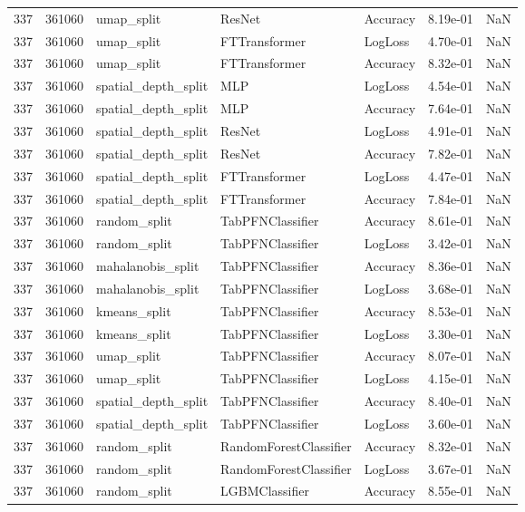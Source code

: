\begin{tabular}{rrlllrr}
337 & 361060 & umap\_split & ResNet & Accuracy & 8.19e-01 & NaN \\
337 & 361060 & umap\_split & FTTransformer & LogLoss & 4.70e-01 & NaN \\
337 & 361060 & umap\_split & FTTransformer & Accuracy & 8.32e-01 & NaN \\
337 & 361060 & spatial\_depth\_split & MLP & LogLoss & 4.54e-01 & NaN \\
337 & 361060 & spatial\_depth\_split & MLP & Accuracy & 7.64e-01 & NaN \\
337 & 361060 & spatial\_depth\_split & ResNet & LogLoss & 4.91e-01 & NaN \\
337 & 361060 & spatial\_depth\_split & ResNet & Accuracy & 7.82e-01 & NaN \\
337 & 361060 & spatial\_depth\_split & FTTransformer & LogLoss & 4.47e-01 & NaN \\
337 & 361060 & spatial\_depth\_split & FTTransformer & Accuracy & 7.84e-01 & NaN \\
337 & 361060 & random\_split & TabPFNClassifier & Accuracy & 8.61e-01 & NaN \\
337 & 361060 & random\_split & TabPFNClassifier & LogLoss & 3.42e-01 & NaN \\
337 & 361060 & mahalanobis\_split & TabPFNClassifier & Accuracy & 8.36e-01 & NaN \\
337 & 361060 & mahalanobis\_split & TabPFNClassifier & LogLoss & 3.68e-01 & NaN \\
337 & 361060 & kmeans\_split & TabPFNClassifier & Accuracy & 8.53e-01 & NaN \\
337 & 361060 & kmeans\_split & TabPFNClassifier & LogLoss & 3.30e-01 & NaN \\
337 & 361060 & umap\_split & TabPFNClassifier & Accuracy & 8.07e-01 & NaN \\
337 & 361060 & umap\_split & TabPFNClassifier & LogLoss & 4.15e-01 & NaN \\
337 & 361060 & spatial\_depth\_split & TabPFNClassifier & Accuracy & 8.40e-01 & NaN \\
337 & 361060 & spatial\_depth\_split & TabPFNClassifier & LogLoss & 3.60e-01 & NaN \\
337 & 361060 & random\_split & RandomForestClassifier & Accuracy & 8.32e-01 & NaN \\
337 & 361060 & random\_split & RandomForestClassifier & LogLoss & 3.67e-01 & NaN \\
337 & 361060 & random\_split & LGBMClassifier & Accuracy & 8.55e-01 & NaN \\

\end{tabular}
